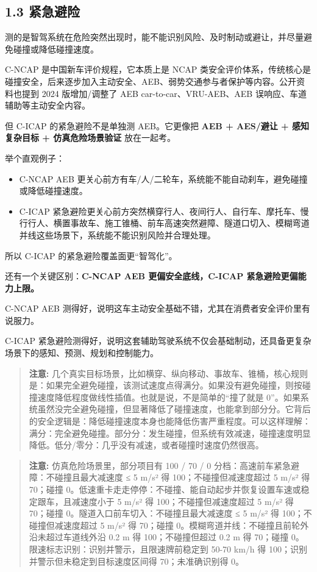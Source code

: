 \subsection{1.3 紧急避险}

测的是智驾系统在危险突然出现时，能不能识别风险、及时制动或避让，并尽量避免碰撞或降低碰撞速度。

C-NCAP 是中国新车评价规程，它本质上是 NCAP 类安全评价体系，传统核心是碰撞安全，后来逐步加入主动安全、AEB、弱势交通参与者保护等内容。公开资料也提到 2024 版增加/调整了 AEB car-to-car、VRU-AEB、AEB 误响应、车道辅助等主动安全内容。

但 C-ICAP 的紧急避险不是单独测 AEB。它更像把 \textbf{AEB + AES/避让 + 感知复杂目标 + 仿真危险场景验证} 放在一起考。

举个直观例子：

\begin{itemize}
  \item C-NCAP AEB 更关心前方有车/人/二轮车，系统能不能自动刹车，避免碰撞或降低碰撞速度。
  \item C-ICAP 紧急避险更关心前方突然横穿行人、夜间行人、自行车、摩托车、慢行行人、横置事故车、施工锥桶、前车高速突然避障、隧道口切入、模糊弯道并线这些场景下，系统能不能识别风险并合理处理。
\end{itemize}

所以 C-ICAP 的紧急避险覆盖面更“智驾化”。

还有一个关键区别：\textbf{C-NCAP AEB 更偏安全底线，C-ICAP 紧急避险更偏能力上限。}

C-NCAP AEB 测得好，说明这车主动安全基础不错，尤其在消费者安全评价里有说服力。

C-ICAP 紧急避险测得好，说明这套辅助驾驶系统不仅会基础制动，还具备更复杂场景下的感知、预测、规划和控制能力。

\begin{quote}
  \textbf{注意:} 几个真实目标场景，比如横穿、纵向移动、事故车、锥桶，核心规则是：如果完全避免碰撞，该测试速度点得满分。如果没有避免碰撞，则按碰撞速度降低程度做线性插值。也就是说，不是简单的“撞了就是 0”。如果系统虽然没完全避免碰撞，但显著降低了碰撞速度，也能拿到部分分。它背后的安全逻辑是：降低碰撞速度本身也能降低伤害严重程度。可以这样理解：满分：完全避免碰撞。部分分：发生碰撞，但系统有效减速，碰撞速度明显降低。低分/零分：几乎没有减速，或者碰撞时速度仍然很高。
\end{quote}

\begin{quote}
  \textbf{注意:} 仿真危险场景里，部分项目有 100 / 70 / 0 分档：高速前车紧急避障：不碰撞且最大减速度 ≤ 5 m/s² 得 100；不碰撞但减速度超过 5 m/s² 得 70；碰撞 0。低速重卡走走停停：不碰撞、能自动起步并恢复设置车速或稳定跟车，且减速度小于 5 m/s² 得 100；不碰撞但减速度超过 5 m/s² 得 70；碰撞 0。隧道入口前车切入：不碰撞且最大减速度 ≤ 5 m/s² 得 100；不碰撞但减速度超过 5 m/s² 得 70；碰撞 0。模糊弯道并线：不碰撞且前轮外沿未超过车道线外沿 0.2 m 得 100；不碰撞但超过 0.2 m 得 70；碰撞 0。限速标志识别：识别并警示，且限速牌前稳定到 50-70 km/h 得 100；识别并警示但未稳定到目标速度区间得 70；未准确识别得 0。
\end{quote}

